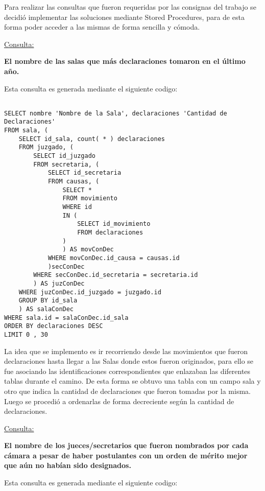 Para realizar las consultas que fueron requeridas por las consignas del trabajo se decidió implementar las soluciones mediante Stored Procedures, para de esta forma poder acceder a las mismas de forma sencilla y cómoda.

\underline{Consulta:}

\textbf{El nombre de las salas que más declaraciones tomaron en el último año.}

Esta consulta es generada mediante el siguiente codigo:

\begin{verbatim}

SELECT nombre 'Nombre de la Sala', declaraciones 'Cantidad de Declaraciones'
FROM sala, (
	SELECT id_sala, count( * ) declaraciones
	FROM juzgado, (
		SELECT id_juzgado
		FROM secretaria, (
			SELECT id_secretaria
			FROM causas, (
				SELECT *
				FROM movimiento
				WHERE id
				IN (
					SELECT id_movimiento
					FROM declaraciones
				)
				) AS movConDec
			WHERE movConDec.id_causa = causas.id
			)secConDec
		WHERE secConDec.id_secretaria = secretaria.id
		) AS juzConDec
	WHERE juzConDec.id_juzgado = juzgado.id
	GROUP BY id_sala
	) AS salaConDec
WHERE sala.id = salaConDec.id_sala
ORDER BY declaraciones DESC
LIMIT 0 , 30

\end{verbatim}

La idea que se implemento es ir recorriendo desde las movimientos que fueron declaraciones hasta llegar a las Salas donde estos fueron originados, para ello se fue asociando las identificaciones correspondientes que enlazaban las diferentes tablas durante el camino. De esta forma se obtuvo una tabla con un campo sala y otro que indica la cantidad de declaraciones que fueron tomadas por la misma. Luego se procedió a ordenarlas de forma decreciente según la cantidad de declaraciones.

\underline{Consulta:}

\textbf{El nombre de los jueces/secretarios que fueron nombrados por cada cámara a pesar de haber postulantes con un orden de mérito mejor que aún no habían sido designados.}

Esta consulta es generada mediante el siguiente codigo:

